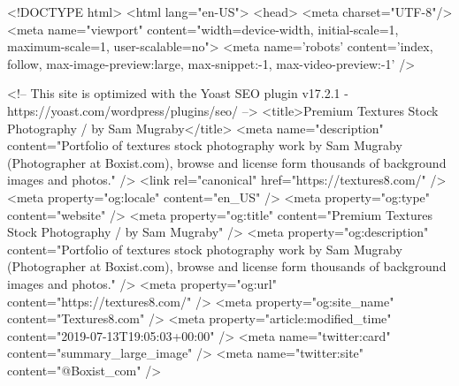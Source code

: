 <!DOCTYPE html>
<html lang="en-US">
<head>
	<meta charset="UTF-8"/>
	<meta name="viewport" content="width=device-width, initial-scale=1, maximum-scale=1, user-scalable=no">
	<meta name='robots' content='index, follow, max-image-preview:large, max-snippet:-1, max-video-preview:-1' />

	<!-- This site is optimized with the Yoast SEO plugin v17.2.1 - https://yoast.com/wordpress/plugins/seo/ -->
	<title>Premium Textures Stock Photography / by Sam Mugraby</title>
	<meta name="description" content="Portfolio of textures stock photography work by Sam Mugraby (Photographer at Boxist.com), browse and license form thousands of background images and photos." />
	<link rel="canonical" href="https://textures8.com/" />
	<meta property="og:locale" content="en_US" />
	<meta property="og:type" content="website" />
	<meta property="og:title" content="Premium Textures Stock Photography / by Sam Mugraby" />
	<meta property="og:description" content="Portfolio of textures stock photography work by Sam Mugraby (Photographer at Boxist.com), browse and license form thousands of background images and photos." />
	<meta property="og:url" content="https://textures8.com/" />
	<meta property="og:site_name" content="Textures8.com" />
	<meta property="article:modified_time" content="2019-07-13T19:05:03+00:00" />
	<meta name="twitter:card" content="summary_large_image" />
	<meta name="twitter:site" content="@Boxist_com" />
